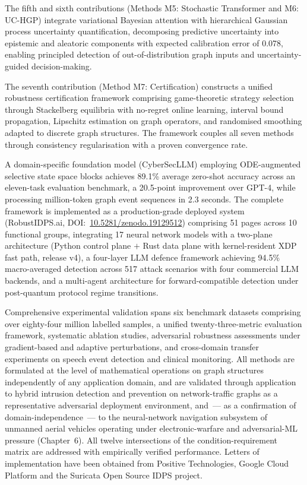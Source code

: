 The fifth and sixth contributions (Methods M5: Stochastic Transformer and M6: UC-HGP) integrate variational Bayesian attention with hierarchical Gaussian process uncertainty quantification, decomposing predictive uncertainty into epistemic and aleatoric components with expected calibration error of 0.078, enabling principled detection of out-of-distribution graph inputs and uncertainty-guided decision-making.

The seventh contribution (Method M7: Certification) constructs a unified robustness certification framework comprising game-theoretic strategy selection through Stackelberg equilibria with no-regret online learning, interval bound propagation, Lipschitz estimation on graph operators, and randomised smoothing adapted to discrete graph structures. The framework couples all seven methods through consistency regularisation with a proven convergence rate.

A domain-specific foundation model (CyberSecLLM) employing ODE-augmented selective state space blocks achieves 89.1\% average zero-shot accuracy across an eleven-task evaluation benchmark, a 20.5-point improvement over GPT-4, while processing million-token graph event sequences in 2.3 seconds. The complete framework is implemented as a production-grade deployed system (\textsf{RobustIDPS.ai}, DOI:~\url{10.5281/zenodo.19129512}) comprising 51 pages across 10 functional groups, integrating 17 neural network models with a two-plane architecture (Python control plane $+$ Rust data plane with kernel-resident XDP fast path, release v4), a four-layer LLM defence framework achieving 94.5\% macro-averaged detection across 517 attack scenarios with four commercial LLM backends, and a multi-agent architecture for forward-compatible detection under post-quantum protocol regime transitions.

Comprehensive experimental validation spans six benchmark datasets comprising over eighty-four million labelled samples, a unified twenty-three-metric evaluation framework, systematic ablation studies, adversarial robustness assessments under gradient-based and adaptive perturbations, and cross-domain transfer experiments on speech event detection and clinical monitoring. All methods are formulated at the level of mathematical operations on graph structures independently of any application domain, and are validated through application to hybrid intrusion detection and prevention on network-traffic graphs as a representative adversarial deployment environment, and~--- as a confirmation of domain-independence~--- to the neural-network navigation subsystem of unmanned aerial vehicles operating under electronic-warfare and adversarial-ML pressure (Chapter~6). All twelve intersections of the condition-requirement matrix are addressed with empirically verified performance. Letters of implementation have been obtained from Positive Technologies, Google Cloud Platform and the Suricata Open Source IDPS project.

